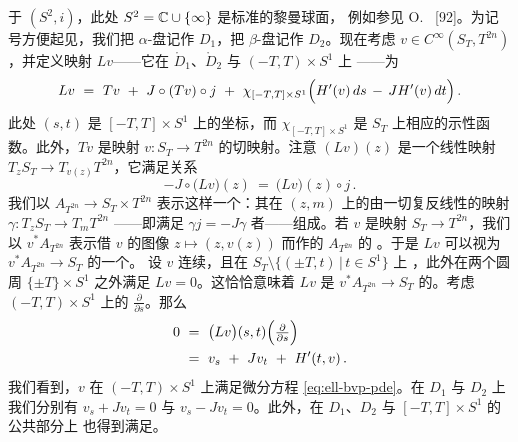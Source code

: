 \trHolomorphic{}于 $(S^{2},i)$，此处 $S^{2}=\mathbb{C}\cup\{\infty\}$ 是标准的黎曼球面，%
例如参见 O.~\trForster{} [92]。为记号方便起见，我们把 $\alpha$-盘记作 $D_{1}$，把%
$\beta$-盘记作 $D_{2}$。现在考虑 $v\in C^{\infty}(S_{T},T^{2n})$，并定义映射%
$Lv$——它在 $\mathring{D}_{1}$、$\mathring{D}_{2}$ 与 $(-T,T)\times S^{1}$ 上%
\trSmooth——为
\begin{equation}\label{eq:ell-lv-torus}
Lv\ =\ Tv\ +\ J\circ(Tv)\circ j\ +\ \chi_{[-T,T]\times S^{1}}\Bigl(H'(v)\,ds\,-\,JH'(v)\,dt\Bigr)\,.
\end{equation}
此处 $(s,t)$ 是 $[-T,T]\times S^{1}$ 上的坐标，而 $\chi_{[-T,T]\times S^{1}}$ 是%
$S_{T}$ 上相应的示性函数。此外，$Tv$ 是映射 $v:S_{T}\to T^{2n}$ 的切映射。注意%
$(Lv)(z)$ 是一个线性映射 $T_{z}S_{T}\to T_{v(z)}T^{2n}$，它满足关系
\[
-J\circ\bigl(Lv\bigr)(z)\ =\ \bigl(Lv\bigr)(z)\circ j\,.
\]
我们以 $A_{T^{2n}}\to S_{T}\times T^{2n}$ 表示这样一个\trVectorBundle：其在%
$(z,m)$ 上的\trFiber{}由一切复反线性的映射 $\gamma:T_{z}S_{T}\to T_{m}T^{2n}$%
——即满足 $\gamma j=-J\gamma$ 者——组成。若 $v$ 是映射 $S_{T}\to T^{2n}$，我们以%
$v^{*}A_{T^{2n}}$ 表示借 $v$ 的图像 $z\mapsto(z,v(z))$ 而作的 $A_{T^{2n}}$ 的%
\trPullback。于是 $Lv$ 可以视为 $v^{*}A_{T^{2n}}\to S_{T}$ 的一个\trSection。%
设 $v$ 连续，且在 $S_{T}\setminus\bigl\{(\pm T,t)\,\big|\,t\in S^{1}\bigr\}$ 上%
\trSmooth，此外在两个圆周 $\{\pm T\}\times S^{1}$ 之外满足 $Lv=0$。这恰恰意味着%
$Lv$ 是 $v^{*}A_{T^{2n}}\to S_{T}$ 的\trZeroSection。考虑 $(-T,T)\times S^{1}$%
上的\trVectorField{} $\frac{\partial}{\partial s}$。那么
\[
\begin{aligned}
0\ &=\ \bigl(Lv\bigr)(s,t)\Bigl(\tfrac{\partial}{\partial s}\Bigr)\\
&=\ v_{s}\ +\ Jv_{t}\ +\ H'(t,v)\,.
\end{aligned}
\]
我们看到，$v$ 在 $(-T,T)\times S^{1}$ 上满足微分方程%
\eqref{eq:ell-bvp-pde}。在 $D_{1}$ 与 $D_{2}$ 上我们分别有 $v_{s}+Jv_{t}=0$ 与%
$v_{s}-Jv_{t}=0$。此外，在 $D_{1}$、$D_{2}$ 与 $[-T,T]\times S^{1}$ 的公共部分上%
\trBoundaryCondition{}也得到满足。

